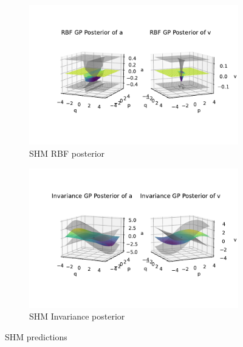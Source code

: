 \documentclass{statsmsc}
\begin{document}
\begin{figure}[H]
     \centering
     \begin{subfigure}[b]{\linewidth}
        \centering
        \includegraphics[width=\linewidth]{../codes/figures/posterior_shm_rbf.pdf}
        \caption{SHM RBF posterior}
        \label{fig:posterior_shm_rbf}
     \end{subfigure}
     \hfill
     \begin{subfigure}[b]{\linewidth}
         \centering
         \includegraphics[width=\linewidth]{../codes/figures/posterior_shm_invariance.pdf}
         \caption{SHM Invariance posterior}
         \label{fig:posterior_shm_invariance}
     \end{subfigure}
        \caption{SHM predictions}
        \label{fig:posterior_shm}
\end{figure}
\end{document}
